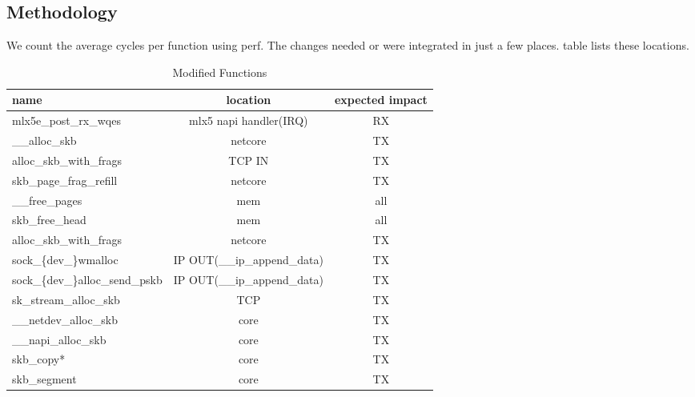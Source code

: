 \subsection{Methodology}
We count the average cycles per function using perf. The changes needed or \oursys were integrated in just a few places. table lists these locations.

\begin{table*}
\centering
\begin{tabular}{l|c|c}
name & location & expected impact \\\hline
mlx5e\_post\_rx\_wqes & mlx5 napi handler(IRQ) & RX\\
\_\_alloc\_skb & net\/core & TX\\
alloc\_skb\_with\_frags & TCP IN & TX\\
skb\_page\_frag\_refill & net\/core & TX\\
\_\_free\_pages & mem & all\\
skb\_free\_head & mem & all\\
alloc\_skb\_with\_frags & net\/core & TX\\
sock\_\{dev\_\}wmalloc & IP OUT(\_\_ip\_append\_data) & TX\\
sock\_\{dev\_\}alloc\_send\_pskb & IP OUT(\_\_ip\_append\_data)& TX\\
sk\_stream\_alloc\_skb & TCP & TX\\
\_\_netdev\_alloc\_skb & core & TX\\
\_\_napi\_alloc\_skb & core & TX\\
skb\_copy* & core & TX \\
skb\_segment & core & TX\\


\hline
\end{tabular}
\caption{\label{tab:func_list}Modified Functions}
\end{table*}
